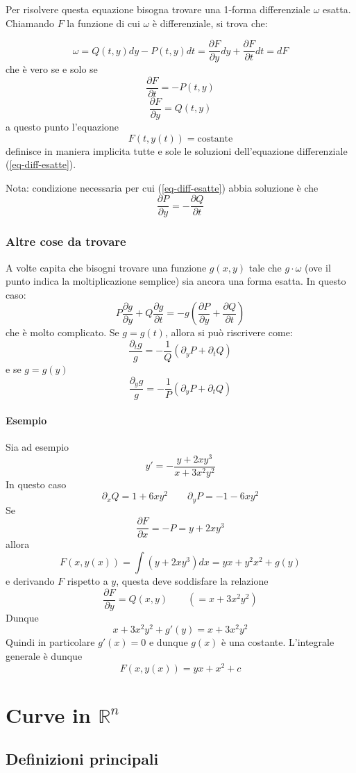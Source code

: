 \documentclass[a4paper,12pt]{article}
\begin{document}
Per risolvere questa equazione bisogna trovare una 1-forma differenziale $\omega$ esatta. Chiamando $F$ la funzione di cui $\omega$ è differenziale, si trova che:

$$\omega = Q(t,y)dy - P(t,y)dt = \frac{\partial F}{\partial y}dy+\frac{\partial F}{\partial t}dt = dF$$
che è vero se e solo se
$$\frac{\partial F}{\partial t}=-P(t,y)$$
$$\frac{\partial F}{\partial y}=Q(t,y)$$
a questo punto l'equazione
$$F(t, y(t)) = \text{costante}$$
definisce in maniera implicita tutte e sole le soluzioni dell'equazione differenziale (\ref{eq-diff-esatte}).

Nota: condizione necessaria per cui (\ref{eq-diff-esatte}) abbia soluzione è che
$$\frac{\partial P}{\partial y}=-\frac{\partial Q}{\partial t}$$

\subsubsection{Altre cose da trovare}
A volte capita che bisogni trovare una funzione $g(x,y)$ tale che $g\cdot\omega$ (ove il punto indica la moltiplicazione semplice) sia ancora una forma esatta. In questo caso:
$$P\frac{\partial g}{\partial y} + Q\frac{\partial g}{\partial t} = -g\left(\frac{\partial P}{\partial y} + \frac{\partial Q}{\partial t}\right)$$
che è molto complicato.
Se $g=g(t)$, allora si può riscrivere come:
$$\frac{\partial_tg}{g} = -\frac{1}{Q}(\partial_yP+\partial_tQ)$$
e se $g=g(y)$
$$\frac{\partial_yg}{g} = -\frac{1}{P}(\partial_yP+\partial_tQ)$$

\paragraph{Esempio}
Sia ad esempio
$$y'=-\frac{y+2xy^3}{x+3x^2y^2}$$
In questo caso
$$\partial_xQ=1+6xy^2\qquad \partial_yP=-1-6xy^2$$
Se
$$\frac{\partial F}{\partial x}=-P = y+2xy^3$$
allora
$$F(x,y(x)) = \int (y+2xy^3)dx = yx+y^2x^2 + g(y)$$
e derivando $F$ rispetto a $y$, questa deve soddisfare la relazione
$$\frac{\partial F}{\partial y}=Q(x,y)\qquad(=x+3x^2y^2)$$
Dunque
$$x+3x^2y^2+g'(y)=x+3x^2y^2$$
Quindi in particolare $g'(x) = 0$ e dunque $g(x)$ è una costante. L'integrale generale è dunque
$$F(x, y(x)) = yx+x^2 + c$$

\section{Curve in $\mathbb{R}^n$}
\subsection{Definizioni principali}
\end{document}
